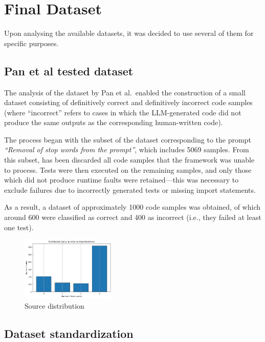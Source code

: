 \clearpage
\section{Final Dataset}
Upon analysing the available datasets, it was 
decided to use several of them for specific purposes. 


\subsection{Pan et al tested dataset}
\label{section:Pan et al tested dataset}
The analysis of the dataset by Pan et al.\ 
enabled the construction of a small dataset 
consisting of definitively correct and definitively 
incorrect code samples (where “incorrect” refers to 
cases in which the LLM-generated code did not produce 
the same outputs as the corresponding human-written code).

The process began with the subset of the dataset 
corresponding to the prompt \textit{“Removal of 
stop words from the prompt”}, which includes 5069 
samples. From this subset, has been discarded all code 
samples that the framework was unable to process. 
Tests were then executed on the remaining samples, 
and only those which did not produce runtime faults 
were retained—this was necessary to exclude failures 
due to incorrectly generated tests or missing import 
statements.

As a result, a dataset of approximately 1000 code 
samples was obtained, of which around 600 were 
classified as correct and 400 as incorrect (i.e., 
they failed at least one test).



\begin{figure}[H]
    \centering
    \includegraphics[width=0.4\textwidth]{img/panetaltest/600600.png}
    \caption{Source distribution}
    \label{fig:panetaltest_600600}
\end{figure}


\subsection{Dataset standardization}

